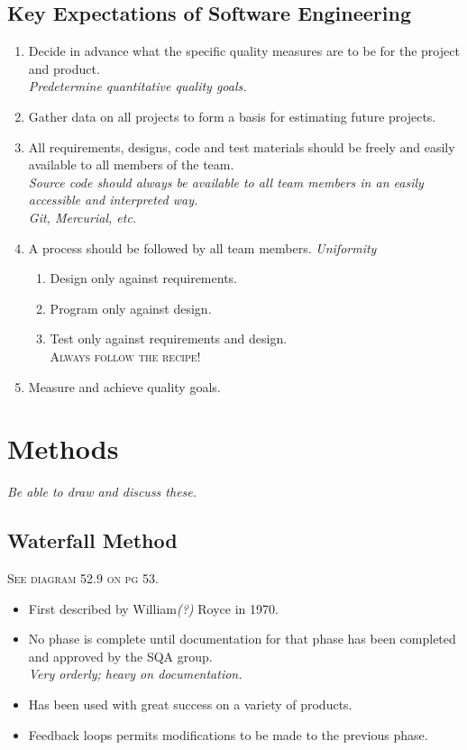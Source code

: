 \documentclass{report}
\begin{document}
		\subsection{Key Expectations of Software Engineering}
			\begin{enumerate}
				\item Decide in advance what the specific quality measures are to be for the project and product.\\
					\textit{Predetermine quantitative quality goals.}
				\item Gather data on all projects to form a basis for estimating future projects.
				\item All requirements, designs, code and test materials should be freely and easily available to all members of the team.\\
					\textit{Source code should always be available to all team members in an easily accessible and interpreted way.\\
								Git, Mercurial, etc.}
				\item A process should be followed by all team members. \textit{Uniformity}
					\begin{enumerate}
						\item Design only against requirements.
						\item Program only against design.
						\item Test only against requirements and design.\\
						\textsc{Always follow the recipe!}
					\end{enumerate}
				\item Measure and achieve quality goals.
			\end{enumerate}
	\section{Methods}
		\emph{Be able to draw and discuss these.}
		\subsection{Waterfall Method}
			\textsc{See diagram 52.9 on pg 53.}
			\begin{itemize}
				\item First described by William\textit{(?)} Royce in 1970.
				\item No phase is complete until documentation for that phase has been completed and approved by the SQA group.\\
					\textit{Very orderly; heavy on documentation.}
				\item Has been used with great success on a variety of products.
				\item Feedback loops permits modifications to be made to the previous phase.
			\end{itemize}
\end{document}
